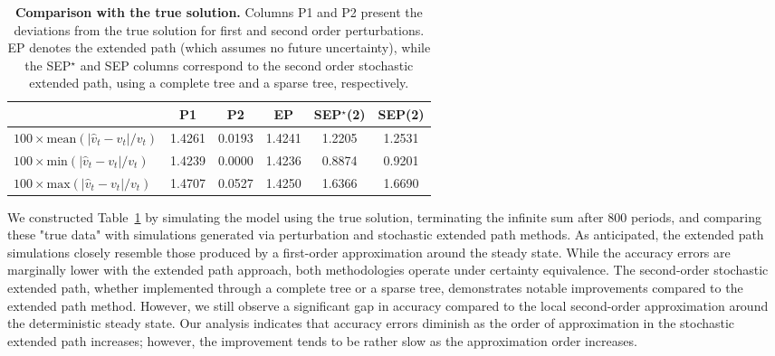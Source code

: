 \documentclass[a4paper,11pt]{amsart}
\begin{document}
\begin{table}[H]
   \centering
   \begin{tabular}{l | S[table-format=1.4] S[table-format=1.4] |  S[table-format=1.4]  | S[table-format=1.4] S[table-format=1.4]}
      \hline
                                                     & {P1}   & {P2}   & {EP}   & {SEP$^{\star}$(2)} & {SEP(2)} \\
      \hline\hline
      $100\times\textrm{mean}(|\hat v_t - v_t|/v_t)$ & 1.4261 & 0.0193 & 1.4241 & 1.2205             & 1.2531   \\
      $100\times\textrm{min}(|\hat v_t - v_t|/v_t)$  & 1.4239 & 0.0000 & 1.4236 & 0.8874             & 0.9201   \\
      $100\times\textrm{max}(|\hat v_t - v_t|/v_t)$  & 1.4707 & 0.0527 & 1.4250 & 1.6366             & 1.6690   \\
      \hline
   \end{tabular}
   \caption{\textbf{Comparison with the true solution.} Columns P1 and
      P2 present the deviations from the true solution for first and
      second order perturbations. EP denotes the extended path (which
      assumes no future uncertainty), while the SEP$^{\star}$ and SEP
      columns correspond to the second order stochastic extended path,
      using a complete tree and a sparse tree, respectively.}
   \label{table:1}
\end{table}


We constructed Table~\ref{table:1} by simulating the model using the
true solution, terminating the infinite sum after 800 periods, and
comparing these "true data" with simulations generated via
perturbation and stochastic extended path methods. As anticipated, the
extended path simulations closely resemble those produced by a
first-order approximation around the steady state. While the accuracy
errors are marginally lower with the extended path approach, both
methodologies operate under certainty equivalence. The second-order
stochastic extended path, whether implemented through a complete tree
or a sparse tree, demonstrates notable improvements compared to the
extended path method. However, we still observe a significant gap in
accuracy compared to the local second-order approximation around the
deterministic steady state. Our analysis indicates that accuracy
errors diminish as the order of approximation in the stochastic
extended path increases; however, the improvement tends to be rather
slow as the approximation order increases.\newline
\end{document}
